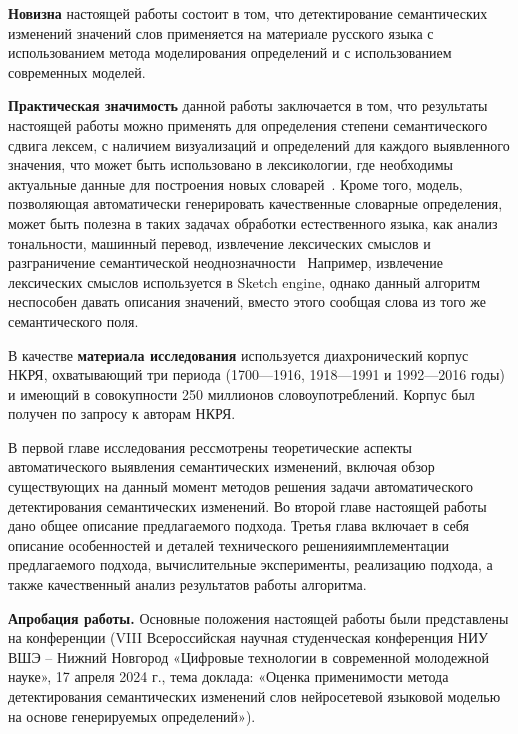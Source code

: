 \documentclass[LI,VKR]{HSEUniversity}
\begin{document}
\textbf{Новизна} настоящей работы состоит в том, что детектирование семантических изменений
значений слов применяется на материале русского языка с использованием метода
моделирования определений и с использованием современных моделей.

\textbf{Практическая значимость} данной работы заключается в том, что результаты настоящей работы
можно применять для определения степени семантического сдвига лексем, с наличием визуализаций и
определений для каждого выявленного значения, что может быть использовано в лексикологии,
где необходимы актуальные данные для построения новых словарей~\cite{DefinitionGenerationMainArticle}.
Кроме того, модель, позволяющая автоматически генерировать качественные словарные определения,
может быть полезна в таких задачах обработки естественного языка, как анализ тональности,
машинный перевод, извлечение лексических смыслов и разграничение семантической неоднозначности~\cite{
    DefinitionModelingReviewAndDatasetAnalysis}
Например, извлечение лексических смыслов используется в Sketch engine,
однако данный алгоритм неспособен давать описания значений,
вместо этого сообщая слова из того же семантического поля.

В качестве \textbf{материала исследования} используется диахронический корпус НКРЯ, охватывающий
три периода (1700—1916, 1918—1991 и 1992—2016 годы) и имеющий в совокупности 250 миллионов
словоупотреблений.
Корпус был получен по запросу к авторам НКРЯ.

В первой главе исследования рессмотрены теоретические аспекты автоматического выявления
семантических изменений, включая обзор существующих на данный момент методов
решения задачи автоматического детектирования семантических изменений.
Во второй главе настоящей работы дано общее описание предлагаемого подхода.
Третья глава включает в себя описание особенностей и деталей
технического решенияимплементации предлагаемого подхода,
вычислительные эксперименты, реализацию подхода, а также качественный анализ результатов работы
алгоритма.

\textbf{Апробация работы.}
Основные положения настоящей работы были представлены на конференции
(VIII Всероссийская научная студенческая конференция НИУ ВШЭ – Нижний Новгород
«Цифровые технологии в современной молодежной науке», 17 апреля 2024 г.,
тема доклада: «Оценка применимости метода детектирования семантических изменений слов нейросетевой
языковой моделью на основе генерируемых определений»).
\end{document}

